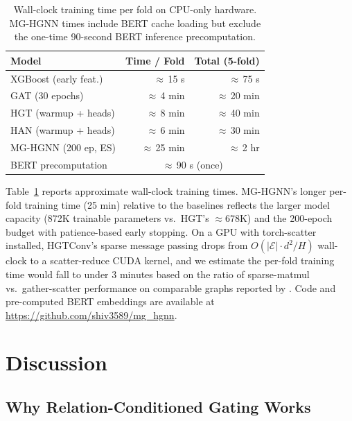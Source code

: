 \documentclass[sigconf,review]{acmart}
\begin{document}
\begin{table}[t]
\centering
\caption{Wall-clock training time per fold on
CPU-only hardware. MG-HGNN times include BERT
cache loading but exclude the one-time 90-second
BERT inference precomputation.}
\label{tab:runtime}
\begin{tabular}{lrr}
\toprule
\textbf{Model}
  & \textbf{Time / Fold}
  & \textbf{Total (5-fold)} \\
\midrule
XGBoost (early feat.) & $\approx$\,15 s & $\approx$\,75 s \\
GAT (30 epochs) & $\approx$\,4 min & $\approx$\,20 min \\
HGT (warmup + heads) & $\approx$\,8 min & $\approx$\,40 min \\
HAN (warmup + heads) & $\approx$\,6 min & $\approx$\,30 min \\
MG-HGNN (200 ep, ES) & $\approx$\,25 min & $\approx$\,2 hr \\
\midrule
BERT precomputation & \multicolumn{2}{c}{$\approx$\,90 s (once)} \\
\bottomrule
\end{tabular}
\end{table}

Table~\ref{tab:runtime} reports approximate
wall-clock training times. MG-HGNN's longer
per-fold training time (25 min) relative to the
baselines reflects the larger model capacity
(872K trainable parameters vs.\ HGT's $\approx$678K)
and the 200-epoch budget with patience-based early
stopping. On a GPU with torch-scatter installed,
HGTConv's sparse message passing drops from
$O(|\mathcal{E}| \cdot d^2/H)$ wall-clock to a
scatter-reduce CUDA kernel, and we estimate the
per-fold training time would fall to under 3 minutes
based on the ratio of sparse-matmul vs.\
gather-scatter performance on comparable graphs
reported by \citet{hu2020heterogeneous}.
Code and pre-computed BERT embeddings are available
at \url{https://github.com/shiv3589/mg_hgnn}.

\section{Discussion}
\label{sec:discussion}

\subsection{Why Relation-Conditioned Gating Works}
\end{document}
